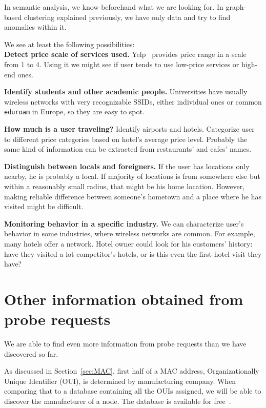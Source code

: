 \documentclass[12pt,a4paper,oneside,pdftex]{report}
\begin{document}
In semantic analysis, we know beforehand what we are looking for. In graph-based clustering explained previously, we have only data and try to find anomalies within it.

We see at least the following possibilities:\\

\textbf{Detect price scale of services used.} Yelp~\cite{yelp} provides price range in a scale from 1 to 4. Using it we might see if user tends to use low-price services or high-end ones.

\textbf{Identify students and other academic people.} Universities have usually wireless networks with very recognizable SSIDs, either individual ones or common \texttt{eduroam} in Europe, so they are easy to spot.

\textbf{How much is a user traveling?} Identify airports and hotels. Categorize user to different price categories based on hotel's average price level. Probably the same kind of information can be extracted from restaurants' and cafes' names.

\textbf{Distinguish between locals and foreigners.} If the user has locations only nearby, he is probably a local. If majority of locations is from somewhere else but within a reasonably small radius, that might be his home location. However, making reliable difference between someone's hometown and a place where he has visited might be difficult.

\textbf{Monitoring behavior in a specific industry.} We can characterize user's behavior in some industries, where wireless networks are common. For example, many hotels offer a network. Hotel owner could look for his customers' history: have they visited a lot competitor's hotels, or is this even the first hotel visit they have? 

\section{Other information obtained from probe requests}
\label{sec:other_info}

We are able to find even more information from probe requests than we have discovered so far.

As discussed in Section~\ref{sec:MAC}, first half of a MAC address, Organizationally Unique Identifier (OUI), is determined by manufacturing company. When comparing that to a database containing all the OUIs assigned, we will be able to discover the manufacturer of a node. The database is available for free~\cite{oui_listing}.
\end{document}

